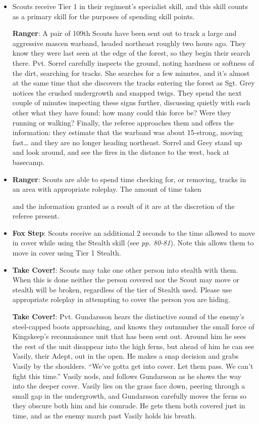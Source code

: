 \documentclass{scrbook}
\begin{document}
\begin{itemize}
\item Scouts receive Tier 1 in their regiment's specialist skill, and this skill counts as a primary skill for the purposes of spending skill points.

\textbf{Ranger}: A pair of 109th Scouts have been sent out to track a large and aggressive mascen warband, headed northeast roughly two hours ago. They know they were last seen at the edge of the forest, so they begin their search there. Pvt. Sorrel carefully inspects the ground, noting hardness or softness of the dirt, searching for tracks. She searches for a few minutes, and it's almost at the same time that she discovers the tracks entering the forest as Sgt. Grey notices the crushed undergrowth and snapped twigs. They spend the next couple of minutes inspecting these signs further, discussing quietly with each other what they have found: how many could this force be? Were they running or walking? Finally, the referee approaches them and offers the information: they estimate that the warband was about 15-strong, moving fast{\dots} and they are no longer heading northeast. Sorrel and Grey stand up and look around, and see the fires in the distance to the west, back at basecamp.

\item \textbf{Ranger}: Scouts are able to spend time checking for, or removing, tracks in an area with appropriate roleplay. The amount of time taken

and the information granted as a result of it are at the discretion of the referee present.

\item \textbf{Fox Step}: Scouts receive an additional 2 seconds to the time allowed to move in cover while using the Stealth skill (see \textit{pp. 80-81}). Note this allows them to move in cover using Tier 1 Stealth.

\item \textbf{Take Cover!}: Scouts may take one other person into stealth with them. When this is done neither the person covered nor the Scout may move or stealth will be broken, regardless of the tier of Stealth used. Please use appropriate roleplay in attempting to cover the person you are hiding.

\textbf{Take Cover!}: Pvt. Gundarsson hears the distinctive sound of the enemy's steel-capped boots approaching, and knows they outnumber the small force of Kingskeep's reconnaisance unit that has been sent out. Around him he sees the rest of the unit disappear into the high ferns, but ahead of him he can see Vasily, their Adept, out in the open. He makes a snap decision and grabs Vasily by the shoulders. ``We've gotta get into cover. Let them pass. We can't fight this time.'' Vasily nods, and follows Gundarsson as he shows the way into the deeper cover. Vasily lies on the grass face down, peering through a small gap in the undergrowth, and Gundarsson carefully moves the ferns so they obscure both him and his comrade. He gets them both covered just in time, and as the enemy march past Vasily holds his breath.

\end{itemize}
\end{document}
